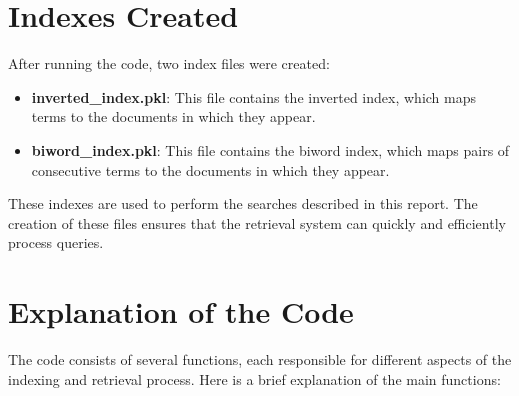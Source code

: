 \documentclass[a4paper,10pt]{article}
\begin{document}
\section{Indexes Created}

After running the code, two index files were created:

\begin{itemize}
    \item \textbf{inverted\_index.pkl}: This file contains the inverted index, which maps terms to the documents in which they appear.
    \item \textbf{biword\_index.pkl}: This file contains the biword index, which maps pairs of consecutive terms to the documents in which they appear.
\end{itemize}

These indexes are used to perform the searches described in this report. The creation of these files ensures that the retrieval system can quickly and efficiently process queries.

\section{Explanation of the Code}

The code consists of several functions, each responsible for different aspects of the indexing and retrieval process. Here is a brief explanation of the main functions:
\end{document}
